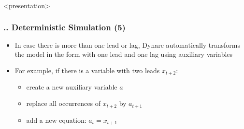 \documentclass[11pt,aspectratio=169]{beamer}
\begin{document}
\begin{frame}<presentation>
	\frametitle{{\thesection.\thesubsection.\thesubsubsection} Deterministic Simulation (5)}
	\begin{itemize}  
		\item In case there is more than one lead or lag, Dynare automatically transforms the model in the form with one lead and one lag using auxiliary variables 
		\item For example, if there is a variable with two leads $x_{t+2}$:
		\begin{itemize}
			\item create a new auxiliary variable $a$
			\item replace all occurrences of $x_{t+2}$ by $a_{t+1}$
			\item add a new equation: $a_t = x_{t+1}$		
		\end{itemize}
	\end{itemize}
\end{frame}
\end{document}
